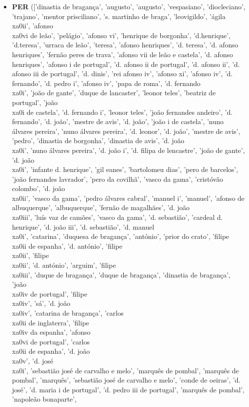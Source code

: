 \documentclass{article}
\begin{document}
\begin{itemize}
\item \textbf{PER} (['dinastia de bragança', 'augusto', 'augusto', 'vespasiano', 'diocleciano', 'trajano', 'mentor prisciliano', 's. martinho de braga', 'leovigildo', 'ágila\\xa0ii', 'afonso\\xa0vi de leão', 'pelágio', 'afonso vi', 'henrique de borgonha', 'd.henrique', 'd.teresa', 'urraca de leão', 'teresa', 'afonso henriques', 'd. teresa', 'd. afonso henriques', 'fernão peres de trava', 'afonso vii de leão e castela', 'd. afonso henriques', 'afonso i de portugal', 'd. afonso ii de portugal', 'd. afonso ii', 'd. afonso iii de portugal', 'd. dinis', 'rei afonso iv', 'afonso xi', 'afonso iv', 'd. fernando', 'd. pedro i', 'afonso iv', 'papa de roma', 'd. fernando\\xa0i', 'joão de gante', 'duque de lancaster', 'leonor teles', 'beatriz de portugal', 'joão\\xa0i de castela', 'd. fernando i', 'leonor teles', 'joão fernandes andeiro', 'd. fernando', 'd. joão', 'mestre de avis', 'd. joão', 'joão i de castela', 'nuno álvares pereira', 'nuno álvares pereira', 'd. leonor', 'd. joão', 'mestre de avis', 'pedro', 'dinastia de borgonha', 'dinastia de avis', 'd. joão\\xa0i', 'nuno álvares pereira', 'd. joão i', 'd. filipa de lencastre', 'joão de gante', 'd. joão\\xa0i', 'infante d. henrique', 'gil eanes', 'bartolomeu dias', 'pero de barcelos', 'joão fernandes lavrador', 'pero da covilhã', 'vasco da gama', 'cristóvão colombo', 'd. joão\\xa0ii', 'vasco da gama', 'pedro álvares cabral', 'manuel i', 'manuel', 'afonso de albuquerque', 'albuquerque', 'fernão de magalhães', 'd. joão\\xa0iii', 'luís vaz de camões', 'vasco da gama', 'd. sebastião', 'cardeal d. henrique', 'd. joão iii', 'd. sebastião', 'd. manuel\\xa0i', 'catarina', 'duquesa de bragança', 'antónio', 'prior do crato', 'filipe\\xa0ii de espanha', 'd. antónio', 'filipe\\xa0ii', 'filipe\\xa0ii', 'd. antónio', 'arguim', 'filipe\\xa0iii', 'duque de bragança', 'duque de bragança', 'dinastia de bragança', 'joão\\xa0iv de portugal', 'filipe\\xa0iv', 'sá', 'd. joão\\xa0iv', 'catarina de bragança', 'carlos\\xa0ii de inglaterra', 'filipe\\xa0iv da espanha', 'afonso\\xa0vi de portugal', 'carlos\\xa0ii de espanha', 'd. joão\\xa0v', 'd. josé\\xa0i', 'sebastião josé de carvalho e melo', 'marquês de pombal', 'marquês de pombal', 'marquês', 'sebastião josé de carvalho e melo', 'conde de oeiras', 'd. josé', 'd. maria i de portugal', 'd. pedro iii de portugal', 'marquês de pombal', 'napoleão bonaparte', 
\end{itemize}
\end{document}
